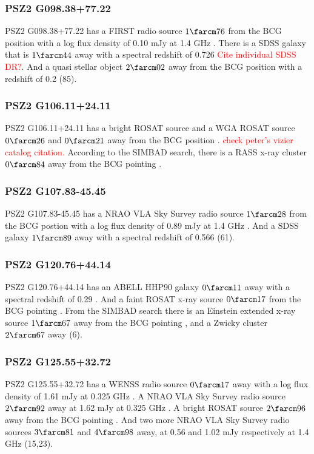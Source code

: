 \documentclass[apj, revtex4-1]{emulateapj}
\newcommand{\editorial}[1]{\textcolor{red}{#1}}
\begin{document}
\subsubsection{PSZ2 G098.38+77.22}
PSZ2 G098.38+77.22 has a FIRST radio source $1\farcm76$ from the BCG position with a log flux density of 0.10 mJy at 1.4 GHz \citep{Becker1995}. There is a SDSS galaxy that is $1\farcm44$ away with a spectral redshift of 0.726 \editorial{Cite individual SDSS DR?}. And a quasi stellar object $2\farcm02$ away from the BCG position with a redshift of 0.2 (85). 

\subsubsection{PSZ2 G106.11+24.11}
PSZ2 G106.11+24.11 has a bright ROSAT source and a WGA ROSAT source $0\farcm26$ and $0\farcm21$ away from the BCG position \citep{Voges1999a}. \editorial{check peter's vizier catalog citation.} According to the SIMBAD search, there is a RASS x-ray cluster $0\farcm84$ away from the BCG pointing \citep{Bohringer2000}.


\subsubsection{PSZ2 G107.83-45.45}
PSZ2 G107.83-45.45 has a NRAO VLA Sky Survey radio source $1\farcm28$ from the BCG postion with a log flux density of 0.89 mJy at 1.4 GHz \citep{Condon1998}. And a SDSS galaxy $1\farcm89$ away with a spectral redshift of 0.566 (61).

\subsubsection{PSZ2 G120.76+44.14}
PSZ2 G120.76+44.14 has an ABELL HHP90 galaxy $0\farcm11$ away with a spectral redshift of 0.29 \citep{Huchra1990}. And a faint ROSAT x-ray source $0\farcm17$ from the BCG pointing \citep{Voges2000}. From the SIMBAD search there is an Einstein extended x-ray source $1\farcm67$ away from the BCG pointing \citep{Oppenheimer1997}, and a Zwicky cluster $2\farcm67$ away (6).

\subsubsection{PSZ2 G125.55+32.72}
PSZ2 G125.55+32.72 has a WENSS radio source $0\farcm17$ away with a log flux density of 1.61 mJy at 0.325 GHz \citep{Rengelink1997}. A NRAO VLA Sky Survey radio source $2\farcm92$ away at 1.62 mJy at 0.325 GHz \citep{Condon1998}. A bright ROSAT source $2\farcm96$ away from the BCG pointing \citep{Voges1999a}. And two more NRAO VLA Sky Survey radio sources $3\farcm81$ and $4\farcm98$ away, at 0.56 and 1.02 mJy respectively at 1.4 GHz (15,23).
\end{document}
